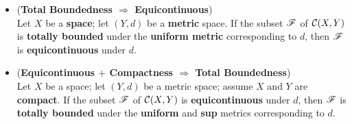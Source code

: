\documentclass[11pt]{article}
\begin{document}
\begin{itemize}
\item \begin{lemma} (\textbf{Total Boundedness $\Rightarrow$ Equicontinuous}) \citep{munkres2000topology}\\ 
Let $X$ be a \textbf{space}; let $(Y, d)$ be a \textbf{metric} space. If the subset ${\mathscr F}$ of ${\mathcal C}(X, Y)$ is \textbf{totally bounded} under the \textbf{uniform metric} corresponding to $d$, then ${\mathscr F}$ is \textbf{equicontinuous} under $d$.
\end{lemma}

\item \begin{lemma} (\textbf{Equicontinuous $+$ Compactness  $\Rightarrow$ Total Boundedness})  \citep{munkres2000topology}\\ 
Let $X$ be a space; let $(Y, d)$ be a metric space; assume $X$ and $Y$ are \textbf{compact}. If the subset ${\mathscr F}$ of ${\mathcal C}(X, Y)$ is \textbf{equicontinuous} under $d$, then ${\mathscr F}$ is \textbf{totally bounded} under the \textbf{uniform} and \textbf{sup} metrics corresponding to $d$.
\end{lemma}


%
%
%


\end{itemize}
\end{document}
